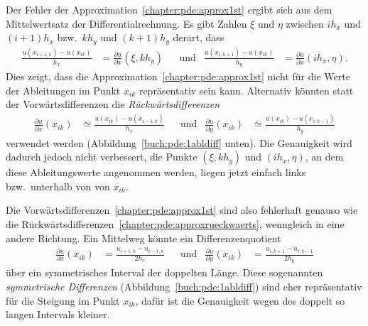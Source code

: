 Der Fehler der Approximation~\eqref{chapter:pde:approx1st} ergibt sich
aus dem Mittelwertsatz der Differentialrechnung.
Es gibt Zahlen $\xi$ und $\eta$ zwischen $ih_x$ und $(i+1)h_x$
bzw.~$kh_y$ und $(k+1)h_y$ derart, dass
\begin{align*}
\frac{u(x_{i+1,k}) - u(x_{ik})}{h_x}
&=
\frac{\partial u}{\partial x}(\xi, kh_y)
&
&\text{und}
&
\frac{u(x_{i,k+1}) - u(x_{ik})}{h_y}
&=
\frac{\partial u}{\partial x}(ih_x, \eta).
\end{align*}
Dies zeigt, dass die Approximation~\eqref{chapter:pde:approx1st}
nicht für die Werte der Ableitungen im Punkt $x_{ik}$ repräsentativ 
sein kann.
Alternativ könnten statt der Vorwärtsdifferenzen die {\em Rückwärtsdifferenzen}
\begin{align}
\frac{\partial u}{\partial x} (x_{ik}) 
&\simeq
\frac{u(x_{ik}) - u(x_{i-1,k})}{h_x}
&
&\text{und}
&
\frac{\partial u}{\partial y} (x_{ik}) 
&\simeq
\frac{u(x_{ik}) - u(x_{i,k-1})}{h_y}
\label{chapter:pde:approxrueckwaerts}
\end{align}
verwendet werden (Abbildung~\ref{buch:pde:1abldiff} unten).
Die Genauigkeit wird dadurch jedoch nicht verbessert, die Punkte
$(\xi,kh_y)$ und $(ih_x,\eta)$, an dem diese Ableitungswerte angenommen
werden, liegen jetzt einfach links bzw.~unterhalb von von $x_{ik}$.

Die Vorwärtsdifferenzen~\eqref{chapter:pde:approx1st} sind also
fehlerhaft genauso wie
die Rückwärtsdifferenzen~\eqref{chapter:pde:approxrueckwaerts},
wenngleich in eine andere Richtung.
Ein Mittelweg könnte ein Differenzenquotient
\begin{align*}
\frac{\partial u}{\partial x}(x_{ik})
&=
\frac{u_{i+1,k}-u_{i-1,k}}{2h_x}
&&\text{und}
&
\frac{\partial u}{\partial y}(x_{ik})
&=
\frac{u_{i,k+1}-u_{i,k-1}}{2h_y}
\end{align*}
über ein symmetrisches Interval der doppelten Länge.
%
Diese sogenannten {\em symmetrische Differenzen}
(Abbildung~\ref{buch:pde:1abldiff}) sind eher repräsentativ
für die Steigung im Punkt $x_{ik}$, dafür ist die Genauigkeit wegen des
doppelt so langen Intervals kleiner.


